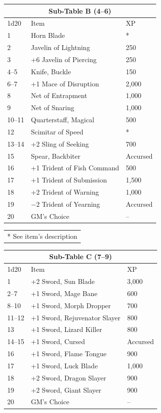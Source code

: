 \begin{multicols}{2}
\noindent \begin{tabular}{|p{}|p{}|p{}|}
\multicolumn{3}{c}{Sub-Table B (4--6)} \\
\hline
1d20	& Item	& XP \\
\hline\hline
\rowcolor[gray]{.9}1	& Horn Blade	& * \\
2	& Javelin of Lightning	& 250 \\
\rowcolor[gray]{.9}3	& +6 Javelin of Piercing	& 250 \\
4--5	& Knife, Buckle	& 150 \\
\rowcolor[gray]{.9}6--7	& +1 Mace of Disruption	& 2,000 \\
8	& Net of Entrapment	& 1,000 \\
\rowcolor[gray]{.9}9	& Net of Snaring	& 1,000 \\
10--11	& Quarterstaff, Magical	& 500 \\
\rowcolor[gray]{.9}12	& Scimitar of Speed	& * \\
13--14	& +2 Sling of Seeking	& 700 \\
\rowcolor[gray]{.9}15	& Spear, Backbiter	& Accursed \\
16	& +1 Trident of Fish Command	& 500 \\
\rowcolor[gray]{.9}17	& +1 Trident of Submission	& 1,500 \\
18	& +2 Trident of Warning	& 1,000 \\
\rowcolor[gray]{.9}19	& $-2$ Trident of Yearning	& Accursed \\
20	& GM's Choice	& -- \\
\hline
\end{tabular}
\noindent\begin{tabular}{p{}}
* See item's description \\
\end{tabular}\vspace{.5em}

\noindent \begin{tabular}{|p{}|p{}|p{}|}
\multicolumn{3}{c}{Sub-Table C (7--9)} \\
\hline
1d20	& Item	& XP \\
\hline\hline
\rowcolor[gray]{.9}1	& +2 Sword, Sun Blade	& 3,000 \\
2--7	& +1 Sword, Mage Bane	& 600 \\
\rowcolor[gray]{.9}8--10	& +1 Sword, Morph Dropper	& 700 \\
11--12	& +1 Sword, Rejuvenator Slayer	& 800 \\
\rowcolor[gray]{.9}13	& +1 Sword, Lizard Killer	& 800 \\
14--15	& +1 Sword, Cursed	& Accursed \\
\rowcolor[gray]{.9}16	& +1 Sword, Flame Tongue	& 900 \\
17	& +1 Sword, Luck Blade	& 1,000 \\
\rowcolor[gray]{.9}18	& +2 Sword, Dragon Slayer	& 900 \\
19	& +2 Sword, Giant Slayer	& 900 \\
\rowcolor[gray]{.9}20	& GM's Choice	& -- \\
\hline
\end{tabular}


\end{multicols}
